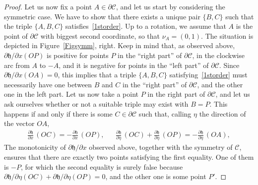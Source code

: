 \documentclass[JEP,XML,SOM,Unicode,NoFloatCountersInSection]{cedram}
\newcommand\C{\mathcal{C}}
\newcommand\h{\mathfrak h}
\theoremstyle{plain}
\theoremstyle{definition}
\begin{document}
\begin{proof}
Let us now fix a point $A\in \partial\C$, and let us start by considering the symmetric case. We have to show that there exists a unique pair $\{B,C\}$ such that the triple $\{A,B,C\}$ satisfies~\eqref{1storder}. Up to a rotation, we assume that $A$ is the point of $\partial\C$ with biggest second coordinate, so that $\nu_A=(0,1)$. The situation is depicted in Figure~\ref{Figsymm}, right. Keep in mind that, as observed above, $\partial\h/\partial x(OP)$ is positive for points $P$ in the ``right part'' of $\partial\C$, \ie in the clockwise arc from $A$ to $-A$, and it is negative for points in the ``left part'' of $\partial \C$. Since $\partial \h/\partial x(OA)=0$, this implies that a triple $\{A,B,C\}$ satisfying~\eqref{1storder} must necessarily have one between $B$ and $C$ in the ``right part'' of $\partial\C$, and the other one in the left part. Let us now take a point $P$ in the right part of $\partial\C$, and let us ask ourselves whether or not a suitable triple may exist with $B=P$. This happens if and only if there is some $C\in\partial\C$ such that, calling $\eta$ the direction of the vector $OA$,
\begin{align}\label{devsod}
\frac{\partial\h}{\partial x}\, (OC) = -\frac{\partial\h}{\partial x}\, (OP), && \frac{\partial\h}{\partial \eta}\, (OC) +\frac{\partial\h}{\partial \eta}\, (OP) = -\frac{\partial\h}{\partial \eta}\, (OA),
\end{align}
The monotonicity of $\partial\h/\partial x$ observed above, together with the symmetry of $\C$, ensures that there are exactly two points satisfying the first equality. One of them is $-P$, for which the second equality is surely false because $\partial \h/\partial\eta(OC) +\partial \h/\partial\eta(OP)=0$, and the other one is some point $P'$.


\end{proof}
\end{document}
